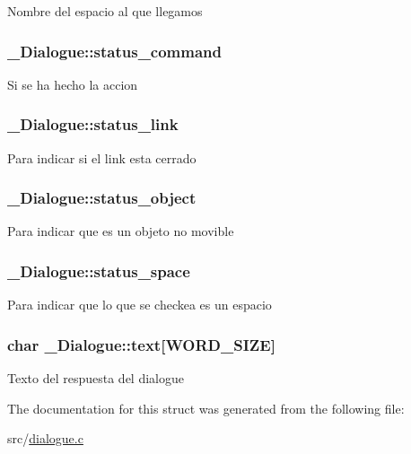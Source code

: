 Nombre del espacio al que llegamos \hypertarget{struct__Dialogue_af479d1df9a92c3233bfaaa3dd332520e}{
\subsubsection[{status\+\_\+command}]{ \+\_\+\+Dialogue\+::status\+\_\+command}}\label{struct__Dialogue_af479d1df9a92c3233bfaaa3dd332520e}
Si se ha hecho la accion \hypertarget{struct__Dialogue_a273106296bef7851f910cbd8ace3c16d}{
\subsubsection[{status\+\_\+link}]{ \+\_\+\+Dialogue\+::status\+\_\+link}}\label{struct__Dialogue_a273106296bef7851f910cbd8ace3c16d}
Para indicar si el link esta cerrado \hypertarget{struct__Dialogue_a877e735a7c75ad25838756e50ca8341e}{
\subsubsection[{status\+\_\+object}]{ \+\_\+\+Dialogue\+::status\+\_\+object}}\label{struct__Dialogue_a877e735a7c75ad25838756e50ca8341e}
Para indicar que es un objeto no movible \hypertarget{struct__Dialogue_aef9641ab92321bf3b59362c8cbb5dad1}{
\subsubsection[{status\+\_\+space}]{ \+\_\+\+Dialogue\+::status\+\_\+space}}\label{struct__Dialogue_aef9641ab92321bf3b59362c8cbb5dad1}
Para indicar que lo que se checkea es un espacio \hypertarget{struct__Dialogue_a6d5e37264cf94fb53c0eb66f796b5705}{
\subsubsection[{text}]{\setlength{\rightskip}{0pt plus 5cm}char \+\_\+\+Dialogue\+::text\mbox{[}{\bf W\+O\+R\+D\+\_\+\+S\+I\+Z\+E}\mbox{]}}}\label{struct__Dialogue_a6d5e37264cf94fb53c0eb66f796b5705}
Texto del respuesta del dialogue 

The documentation for this struct was generated from the following file\+:\begin{DoxyCompactItemize}
\item 
src/\hyperlink{dialogue_8c}{dialogue.\+c}\end{DoxyCompactItemize}
